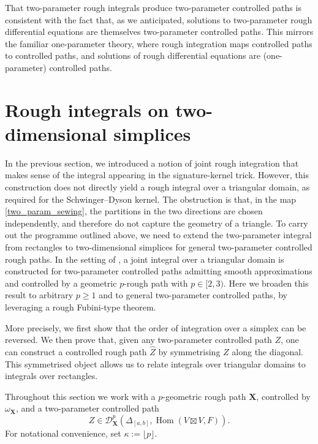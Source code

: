\documentclass{article}%
\begin{document}
That two-parameter rough integrals produce two-parameter controlled paths is consistent with the fact that, as we anticipated, solutions to two-parameter rough differential equations are themselves two-parameter controlled paths. This mirrors the familiar one-parameter theory, where rough integration maps controlled paths to controlled paths, and solutions of rough differential equations are (one-parameter) controlled paths.




\section{Rough integrals on two-dimensional simplices} \label{Simplex_section}
In the previous section, we introduced a notion of joint rough integration that makes sense of the integral appearing in the signature-kernel trick. However, this construction does not directly yield a rough integral over a triangular domain, as required for the Schwinger--Dyson kernel. The obstruction is that, in the map \eqref{two_param_sewing}, the partitions in the two directions are chosen independently, and therefore do not capture the geometry of a triangle.\newline
To carry out the programme outlined above, we need to extend the two-parameter integral from rectangles to two-dimensional simplices for general two-parameter controlled rough paths. In the setting of \cite{gerasimovivcs2019hormander}, a joint integral over a triangular domain is constructed for two-parameter controlled paths admitting smooth approximations and controlled by a geometric $p$-rough path with $p\in[2,3)$. Here we broaden this result to arbitrary $p\ge 1$ and to general two-parameter controlled paths, by leveraging a rough Fubini-type theorem.

More precisely, we first show that the order of integration over a simplex can be reversed. We then prove that, given any two-parameter controlled path $Z$, one can construct a controlled rough path $\widehat{Z}$ by symmetrising $Z$ along the diagonal. This symmetrised object allows us to relate integrals over triangular domains to integrals over rectangles.
 

Throughout this section we work with a \(p\)-geometric rough path \(\mathbf{X}\), controlled by \(\omega_{\mathbf{X}}\), and a two-parameter controlled path
\[
Z \in \mathcal{D}^{p}_{\mathbf{X}}\!\left( \Delta_{[a,b]} , \operatorname{Hom}(V \boxtimes V, F)\right).
\]
For notational convenience, set \(\kappa := \lfloor p\rfloor\).
\end{document}
